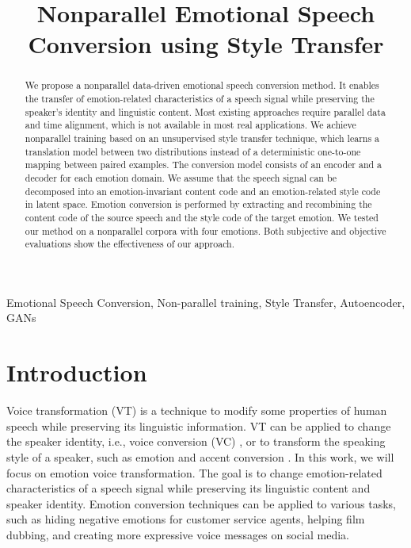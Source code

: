\documentclass{article}
\title{Nonparallel Emotional Speech Conversion using Style Transfer}
\begin{document}
%
\maketitle
%
\begin{abstract}
We propose a nonparallel data-driven emotional speech conversion method. It enables the transfer of emotion-related characteristics of a speech signal while preserving the speaker's identity and linguistic content. Most existing approaches require parallel data and time alignment, which is not available in most real applications. We achieve nonparallel training based on an unsupervised style transfer technique, which learns a translation model between two distributions instead of a deterministic one-to-one mapping between paired examples. The conversion model consists of an encoder and a decoder for each emotion domain. We assume that the speech signal can be decomposed into an emotion-invariant content code and an emotion-related style code in latent space. Emotion conversion is performed by extracting and recombining the content code of the source speech and the style code of the target emotion. We tested our method on a nonparallel corpora with four emotions. Both subjective and objective evaluations show the effectiveness of our approach.
\end{abstract}

%
\begin{keywords}
Emotional Speech Conversion, Non-parallel training, Style Transfer, Autoencoder, GANs
\end{keywords}
%



\section{Introduction}
\label{sec:intro}
Voice transformation (VT) is a technique to modify some properties of human speech while preserving its linguistic information. VT can be applied to change the speaker identity, i.e., voice conversion (VC) \cite{mohammadi2017overview}, or to transform the speaking style of a speaker, such as emotion and accent conversion \cite{zhao2018accent}. In this work, we will focus on emotion voice transformation. The goal is to change emotion-related characteristics of a speech signal while preserving its linguistic content and speaker identity. Emotion conversion techniques can be applied to various tasks, such as hiding negative emotions for customer service agents, helping film dubbing, and creating more expressive voice messages on social media.
\end{document}
